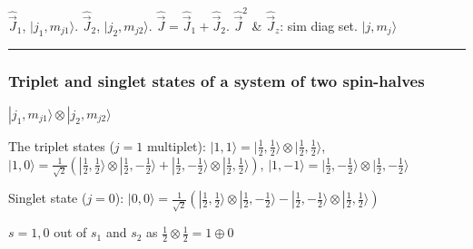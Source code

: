 $\widehat{\vec{J}}_1$, $|j_1, m_{j1} \rangle$. $\widehat{\vec{J}}_2$, $|j_2, m_{j2} \rangle$. $\widehat{\vec{J}} = \widehat{\vec{J}}_1 + \widehat{\vec{J}}_2$.
$\widehat{\vec{J}}^2$ \& $\widehat{\vec{J}}_z$: sim diag set. $|j, m_j \rangle$

\hrule height 0.05pt

\subsubsection{Triplet and singlet states of a system of two spin-halves}

$| j_1, m_{j1} \rangle \otimes | j_2, m_{j2} \rangle$


The triplet states ($j=1$ multiplet):
$|1, 1 \rangle = |\frac{1}{2}, \frac{1}{2} \rangle \otimes | \frac{1}{2}, \frac{1}{2} \rangle$, 
$|1, 0 \rangle = \frac{1}{\sqrt{2}} (|\frac{1}{2}, \frac{1}{2} \rangle \otimes | \frac{1}{2}, -\frac{1}{2} \rangle + | \frac{1}{2}, -\frac{1}{2} \rangle \otimes | \frac{1}{2}, \frac{1}{2} \rangle)$,
$|1, -1 \rangle = |\frac{1}{2}, -\frac{1}{2} \rangle \otimes |\frac{1}{2}, -\frac{1}{2} \rangle$

Singlet state ($j=0$): $|0,0 \rangle = \frac{1}{\sqrt{2}} (|\frac{1}{2}, \frac{1}{2} \rangle \otimes |\frac{1}{2}, -\frac{1}{2} \rangle - | \frac{1}{2}, -\frac{1}{2} \rangle \otimes |\frac{1}{2}, \frac{1}{2} \rangle)$

$s=1, 0$ out of $s_1$ and $s_2$ as $\frac{1}{2} \otimes \frac{1}{2} = 1 \oplus 0$



